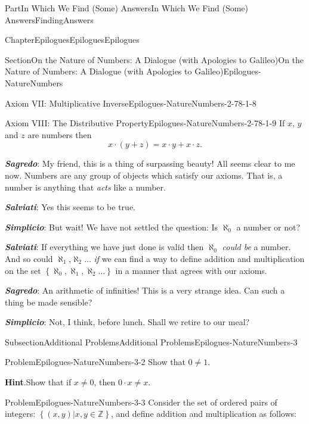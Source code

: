 \documentclass[oneside,10pt,]{book}
\newcommand{\blocktitlefont}{\relax}
\newcommand{\alert}[1]{\textbf{\textit{#1}}}
\numberwithin{equation}{part}
\newcommand{\ZZ}{\mathbb {Z}}
\begin{document}
\begin{partptx}{Part}{In Which We Find (Some) Answers}{}{In Which We Find (Some) Answers}{}{}{FindingAnswers}
\begin{chapterptx}{Chapter}{Epilogues}{}{Epilogues}{}{}{Epilogues}
\begin{sectionptx}{Section}{On the Nature of Numbers: A Dialogue (with Apologies to Galileo)}{}{On the Nature of Numbers: A Dialogue (with Apologies to Galileo)}{}{}{Epilogues-NatureNumbers}
\begin{introduction}{}
\begin{descriptionlist}
\begin{dlimedium}{Axiom VII: Multiplicative Inverse}{Epilogues-NatureNumbers-2-78-1-8}
\begin{equation*}
\end{equation*}
%
\end{dlimedium}%
\begin{dlimedium}{Axiom VIII: The Distributive Property}{Epilogues-NatureNumbers-2-78-1-9}%
If \(x\), \(y\) and \(z\) are numbers then%
\begin{equation*}
x\cdot(y+z) = x\cdot y+x\cdot z\text{.}
\end{equation*}
%
\end{dlimedium}%
\end{descriptionlist}
%
\par
\alert{Sagredo}: My friend, this is a thing of surpassing beauty! All seems clear to me now. Numbers are any group of objects which satisfy our axioms. That is, a number is anything that \emph{acts} like a number.%
\par
\alert{Salviati}:  Yes this seems to be true.%
\par
\alert{Simplicio}:  But wait! We have not settled the question: Is \(\aleph_0\) a number or not?%
\par
\alert{Salviati}:  If everything we have just done is valid then \(\aleph_0\) \emph{could be} a number. And so could \(\aleph_1\),\(\aleph_2 \ldots\) \emph{if} we can find a way to define addition and multiplication on the set \(\left\{\aleph_0, \aleph_1, \aleph_2 \ldots\right\}\) in a manner that agrees with our axioms.%
\par
\alert{Sagredo}:  An arithmetic of infinities! This is a very strange idea. Can such a thing be made sensible?%
\par
\alert{Simplicio}:  Not, I think, before lunch. Shall we retire to our meal?%
\end{introduction}%
%
%
\typeout{************************************************}
\typeout{************************************************}
%
\begin{subsectionptx}{Subsection}{Additional Problems}{}{Additional Problems}{}{}{Epilogues-NatureNumbers-3}
\begin{problem}{Problem}{}{Epilogues-NatureNumbers-3-2}%
Show that \(0\neq 1\).%
\par\smallskip%
\noindent\textbf{\blocktitlefont Hint}.\hypertarget{Epilogues-NatureNumbers-3-2-3}{}\quad{}Show that if \(x\neq0\), then \(0\cdot x \neq x\).%
\end{problem}
\begin{problem}{Problem}{}{Epilogues-NatureNumbers-3-3}%
Consider the set of ordered pairs of integers: \(\left\{(x,y)|x, y \in \ZZ\right\}\), and define addition and multiplication as follows:%

\end{problem}
\end{subsectionptx}
\end{sectionptx}
\end{chapterptx}
\end{partptx}
\end{document}

